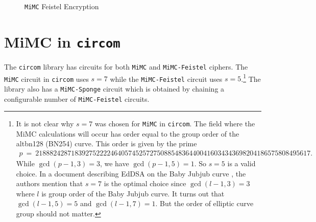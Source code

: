 \documentclass[10pt]{article}
\begin{document}
\begin{figure}[t]
\begin{center}
\end{center}
\caption{\texttt{MiMC} Feistel Encryption}%
\label{fig:MiMCFeistelEncryption}
\end{figure}


\section{MiMC in \texttt{circom}}%
\label{sec:mimc_in_circom}
The \texttt{circom} library \cite{circomlib} has circuits for both \texttt{MiMC} and \texttt{MiMC-Feistel} ciphers. The \texttt{MiMC} circuit in \texttt{circom} uses $s=7$ while the \texttt{MiMC-Feistel} circuit uses $s=5$.\footnote{
It is not clear why $s=7$ was chosen for \texttt{MiMC} in \texttt{circom}. The field where the MiMC calculations will occur has order equal to the group order of the alt\textunderscore bn128 (BN254) curve. This order is given by the prime
\begin{align*}
{\scriptstyle
  p\  =\  21888242871839275222246405745257275088548364400416034343698204186575808495617.
}
\end{align*}
While $\gcd(p-1, 3) = 3$, we have $\gcd(p-1, 5)=1$. So $s=5$ is a valid choice. In a document describing EdDSA on the Baby Jubjub curve \cite{eddsa_babyjubjub_mimc7}, the authors mention that $s=7$ is the optimal choice since $\gcd(l-1, 3)=3$ where $l$ is group order of the Baby Jubjub curve. It turns out that $\gcd(l-1, 5)=5$ and $\gcd(l-1, 7)=1$. But the order of elliptic curve group should not matter.
} The library also has a \texttt{MiMC-Sponge} circuit which is obtained by chaining a configurable number of \texttt{MiMC-Feistel} circuits.
\end{document}
